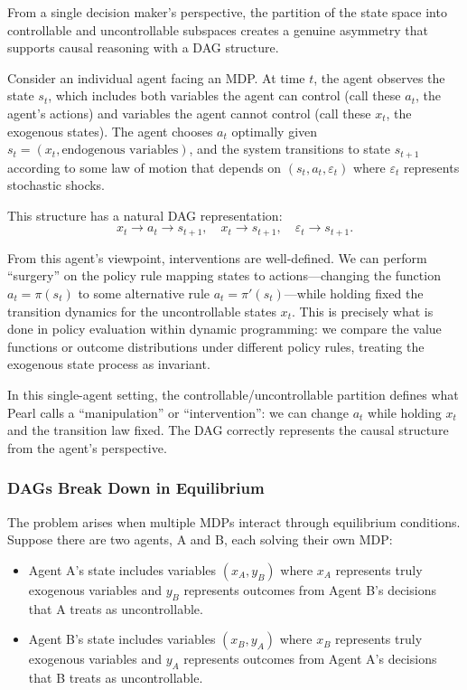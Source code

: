 \documentclass[12pt]{article}
\begin{document}
From a single decision maker's perspective, the partition of the state space into controllable and uncontrollable subspaces creates a genuine asymmetry that supports causal reasoning with a DAG structure.

Consider an individual agent facing an MDP. At time $t$, the agent observes the state $s_t$, which includes both variables the agent can control (call these $a_t$, the agent's actions) and variables the agent cannot control (call these $x_t$, the exogenous states). The agent chooses $a_t$ optimally given $s_t = (x_t, \text{endogenous variables})$, and the system transitions to state $s_{t+1}$ according to some law of motion that depends on $(s_t, a_t, \varepsilon_t)$ where $\varepsilon_t$ represents stochastic shocks.

This structure has a natural DAG representation:
\[
x_t \to a_t \to s_{t+1}, \quad x_t \to s_{t+1}, \quad \varepsilon_t \to s_{t+1}.
\]

From this agent's viewpoint, interventions are well-defined. We can perform ``surgery'' on the policy rule mapping states to actions---changing the function $a_t = \pi(s_t)$ to some alternative rule $a_t = \pi'(s_t)$---while holding fixed the transition dynamics for the uncontrollable states $x_t$. This is precisely what is done in policy evaluation within dynamic programming: we compare the value functions or outcome distributions under different policy rules, treating the exogenous state process as invariant.

In this single-agent setting, the controllable/uncontrollable partition defines what Pearl calls a ``manipulation'' or ``intervention'': we can change $a_t$ while holding $x_t$ and the transition law fixed. The DAG correctly represents the causal structure from the agent's perspective.

\subsubsection{DAGs Break Down in Equilibrium}

The problem arises when multiple MDPs interact through equilibrium conditions. Suppose there are two agents, A and B, each solving their own MDP:
\begin{itemize}
\item Agent A's state includes variables $(x_A, y_B)$ where $x_A$ represents truly exogenous variables and $y_B$ represents outcomes from Agent B's decisions that A treats as uncontrollable.
\item Agent B's state includes variables $(x_B, y_A)$ where $x_B$ represents truly exogenous variables and $y_A$ represents outcomes from Agent A's decisions that B treats as uncontrollable.
\end{itemize}
\end{document}
